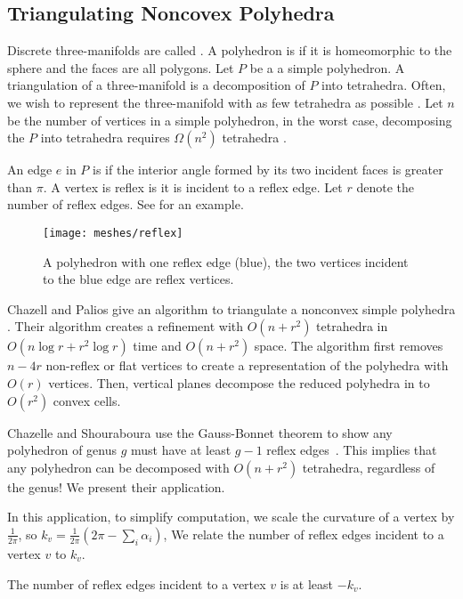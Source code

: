 \subsection{Triangulating Noncovex Polyhedra}
\label{sec:triangulating}

Discrete three-manifolds are called . 
A polyhedron is  if it is homeomorphic to the sphere 
and the faces are all polygons.
Let $P$ be a a simple polyhedron.
A triangulation of a three-manifold is a decomposition
of $P$ into tetrahedra.
Often, we wish to represent the three-manifold
with as few tetrahedra as possible \cite{simplify-mesh-1999}.
Let $n$ be the number of vertices in a simple polyhedron,
in the worst case, decomposing the $P$
 into tetrahedra requires $\Omega(n^2)$ tetrahedra
\cite{chazelle-lower-1984}.

 An edge $e$ in $P$ is
 if the interior angle formed by its two incident faces
is greater than $\pi$.
A vertex is reflex is it is incident to a reflex edge.
Let $r$ denote the number of reflex edges.
See  for an example.

\begin{figure}[htb]
\centering
\texttt{[image: meshes/reflex]}
\caption{A polyhedron with one reflex edge (blue), the two vertices incident to the blue
edge are reflex vertices.}
\label{fig:reflex}
\end{figure}
Chazell and Palios give an
algorithm to triangulate a nonconvex simple polyhedra \cite{triangulating-polytope-1990}.
 Their algorithm creates a refinement with $O(n+r^2)$ tetrahedra
in $O(n\log r +r^2\log r)$ time and $O(n+r^2)$ space.
The algorithm first removes $n-4r$ non-reflex or flat vertices
to create a representation of the polyhedra with $O(r)$ vertices.
Then, vertical planes decompose the reduced polyhedra in to
$O(r^2)$ convex cells.

Chazelle and Shouraboura use the Gauss-Bonnet theorem to show any polyhedron
 of genus $g$ must have at least $g-1$ reflex edges~\cite{tetra-bounds-c-s-1994}.
 This implies that any polyhedron
can be decomposed with $O(n+r^2)$ tetrahedra, regardless  of 
the genus!  We present their application.

In this application, to simplify computation, we scale the curvature of a vertex
by $\frac{1}{2\pi}$, so $k_v=\frac{1}{2\pi}\left(2\pi-\sum_i \alpha_i\right)$,
We relate the number of reflex edges incident to a vertex $v$ to $k_v$.

\begin{lemma}\label{lem:reflex-edge}
The number of reflex edges  incident to a vertex $v$  is at least $-k_v.$
\end{lemma}


